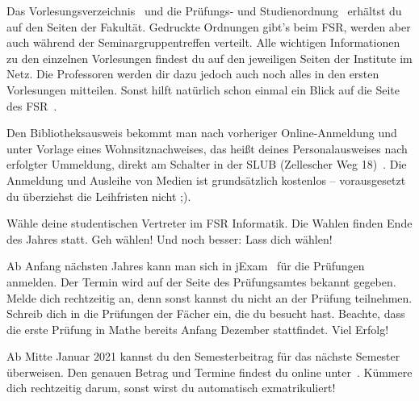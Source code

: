 \begin{itemize}[leftmargin=*]
Das Vorlesungsverzeichnis~ und die Prüfungs- und
Studienordnung~ erhältst du
auf den Seiten der Fakultät. Gedruckte Ordnungen gibt's beim FSR, werden aber auch während der Seminargruppentreffen verteilt.
Alle wichtigen Informationen zu den einzelnen Vorlesungen findest du
auf den jeweiligen Seiten der Institute im Netz.  Die Professoren werden dir
dazu jedoch auch noch alles in den ersten Vorlesungen mitteilen. Sonst hilft
natürlich schon einmal ein Blick auf die Seite des FSR~.

Den Bibliotheksausweis bekommt man nach vorheriger Online-Anmeldung und unter Vorlage eines
Wohnsitznachweises, das heißt deines Personalausweises nach erfolgter Ummeldung,
direkt am Schalter in der SLUB (Zellescher Weg 18)~. Die Anmeldung und Ausleihe
von Medien ist grundsätzlich kostenlos -- vorausgesetzt du überziehst die
Leihfristen nicht ;).

Wähle deine studentischen Vertreter im FSR Informatik. Die Wahlen finden Ende des Jahres statt. Geh wählen! Und noch besser: Lass dich wählen!


Ab Anfang nächsten Jahres kann man sich in jExam~ für die Prüfungen anmelden.
Der Termin wird auf der Seite des Prüfungsamtes bekannt gegeben. Melde dich
rechtzeitig an, denn sonst kannst du nicht an der Prüfung teilnehmen. Schreib
dich in die Prüfungen der Fächer ein, die du besucht hast. Beachte, dass die
erste Prüfung in Mathe bereits Anfang Dezember stattfindet. Viel Erfolg!

Ab Mitte Januar 2021 kannst du den Semesterbeitrag für das nächste Semester
überweisen. Den genauen Betrag und Termine findest du online unter~. Kümmere dich rechtzeitig darum,
sonst wirst du automatisch exmatrikuliert!

\end{itemize}

\vfill

